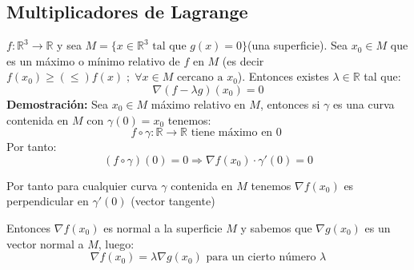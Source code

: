 \documentclass[11pt]{article}
\newcommand{\R}{\mathbb{R}}
\theoremstyle{plain}
\begin{document}
    \subsection{Multiplicadores de Lagrange} %
    \label{sub:multiplicadores_de_lagrange}
    $f:\R^3 \rightarrow \R$ y sea $M = \{x \in \R^3\text{ tal que }g(x)= 0\}$(una superficie). Sea $x_0 \in M$ que es un máximo o mínimo relativo de $f$ en $M$ (es decir $f(x_0) \ge(\le) f(x)  \; ;\; \forall x \in M \text{ cercano a }x_0$). Entonces existes $\lambda \in \R$ tal que:
    \[\nabla(f - \lambda g)(x_0) = 0\]
    \textbf{Demostración:} Sea $x_0 \in M$ máximo relativo en $M$, entonces si $\gamma$ es una curva contenida en $M$ con $\gamma(0) = x_0$ tenemos:
    \[f \circ \gamma: \R \rightarrow \R \text{ tiene máximo en 0 }\]
    Por tanto:
    \[(f \circ \gamma)(0) = 0 \Rightarrow \nabla f(x_0) \cdot \gamma'(0) = 0\] 
    
    Por tanto para cualquier curva $\gamma$ contenida en $M$ tenemos $\nabla f(x_0)$ es perpendicular en $\gamma'(0)$ (vector tangente)

    Entonces $\nabla f(x_0)$ es normal a la superficie $M$ y sabemos que $\nabla g(x_0)$ es un vector normal a $M$, luego:
    \[\nabla f(x_0) = \lambda \nabla g(x_0) \text{ para un cierto número $\lambda$}\]
\end{document}
